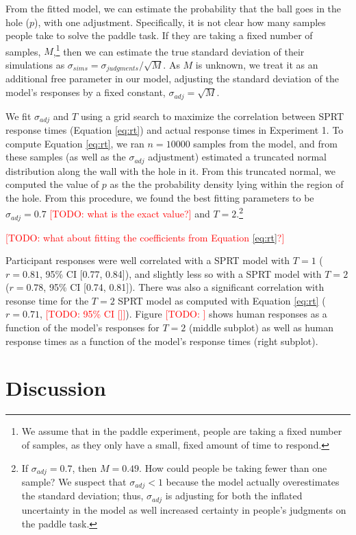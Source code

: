 \documentclass[10pt,letterpaper]{article}
\newcommand{\TODO}[1]{\textcolor{red}{[TODO: #1]}}
\begin{document}
From the fitted model, we can estimate the probability that the ball goes in the hole ($p$), with one adjustment. Specifically, it is not clear how many samples people take to solve the paddle task. If they are taking a fixed number of samples, $M$,\footnote{We assume that in the paddle experiment, people are taking a fixed number of samples, as they only have a small, fixed amount of time to respond.} then we can estimate the true standard deviation of their simulations as $\sigma_{sims} = \sigma_{judgments} / \sqrt{M}$. As $M$ is unknown, we treat it as an additional free parameter in our model, adjusting the standard deviation of the model's responses by a fixed constant, $\sigma_{adj}=\sqrt{M}$.

We fit $\sigma_{adj}$ and $T$ using a grid search to maximize the correlation between SPRT response times (Equation \ref{eq:rt}) and actual response times in Experiment 1. To compute Equation \ref{eq:rt}, we ran $n=10000$ samples from the model, and from these samples (as well as the $\sigma_{adj}$ adjustment) estimated a truncated normal distribution along the wall with the hole in it. From this truncated normal, we computed the value of $p$ as the the probability density lying within the region of the hole. From this procedure, we found the best fitting parameters to be $\sigma_{adj}=0.7$ \TODO{what is the exact value?} and $T=2$.\footnote{If $\sigma_{adj}=0.7$, then $M=0.49$. How could people be taking fewer than one sample? We suspect that $\sigma_{adj}<1$ because the model actually overestimates the standard deviation; thus, $\sigma_{adj}$ is adjusting for both the inflated uncertainty in the model as well increased certainty in people's judgments on the paddle task.}

\TODO{what about fitting the coefficients from Equation \ref{eq:rt}?}

Participant responses were well correlated with a SPRT model with $T=1$ ($r=0.81$, 95\% CI [0.77, 0.84]), and slightly less so with a SPRT model with $T=2$ ($r=0.78$, 95\% CI [0.74, 0.81]). There was also a significant correlation with resonse time for the $T=2$ SPRT model as computed with Equation \ref{eq:rt} ($r=0.71$, \TODO{95\% CI []}). Figure \TODO{} shows human responses as a function of the model's responses for $T=2$ (middle subplot) as well as human response times as a function of the model's response times (right subplot).

\section{Discussion}
\end{document}
